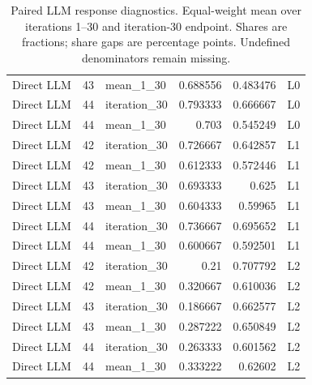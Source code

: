 \begin{table}[htbp!]
\begin{tabular}{lrlrrl}
Direct LLM & 43 & mean\_1\_30 & 0.688556 & 0.483476 & L0 \\
Direct LLM & 44 & iteration\_30 & 0.793333 & 0.666667 & L0 \\
Direct LLM & 44 & mean\_1\_30 & 0.703 & 0.545249 & L0 \\
Direct LLM & 42 & iteration\_30 & 0.726667 & 0.642857 & L1 \\
Direct LLM & 42 & mean\_1\_30 & 0.612333 & 0.572446 & L1 \\
Direct LLM & 43 & iteration\_30 & 0.693333 & 0.625 & L1 \\
Direct LLM & 43 & mean\_1\_30 & 0.604333 & 0.59965 & L1 \\
Direct LLM & 44 & iteration\_30 & 0.736667 & 0.695652 & L1 \\
Direct LLM & 44 & mean\_1\_30 & 0.600667 & 0.592501 & L1 \\
Direct LLM & 42 & iteration\_30 & 0.21 & 0.707792 & L2 \\
Direct LLM & 42 & mean\_1\_30 & 0.320667 & 0.610036 & L2 \\
Direct LLM & 43 & iteration\_30 & 0.186667 & 0.662577 & L2 \\
Direct LLM & 43 & mean\_1\_30 & 0.287222 & 0.650849 & L2 \\
Direct LLM & 44 & iteration\_30 & 0.263333 & 0.601562 & L2 \\
Direct LLM & 44 & mean\_1\_30 & 0.333222 & 0.62602 & L2 \\
\hline
\end{tabular}
\caption{Paired LLM response diagnostics. Equal-weight mean over iterations 1--30 and iteration-30 endpoint. Shares are fractions; share gaps are percentage points. Undefined denominators remain missing.}
\label{chap:results:tab:rq2_llm_repeatability}
\end{table}
